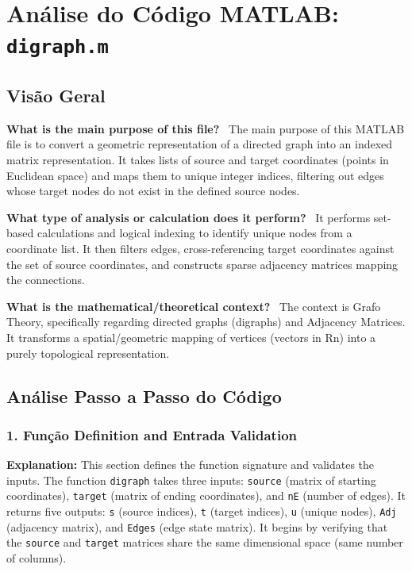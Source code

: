 
\chapter{Análise do Código MATLAB: \texttt{digraph.m}}
\author{Expert Software Engineer}
\section{Visão Geral}

\textbf{What is the main purpose of this file?} \
The main purpose of this MATLAB file is to convert a geometric representation of a directed graph into an indexed matrix representation. It takes lists of source and target coordinates (points in Euclidean space) and maps them to unique integer indices, filtering out edges whose target nodes do not exist in the defined source nodes.

\textbf{What type of analysis or calculation does it perform?} \
It performs set-based calculations and logical indexing to identify unique nodes from a coordinate list. It then filters edges, cross-referencing target coordinates against the set of source coordinates, and constructs sparse adjacency matrices mapping the connections.

\textbf{What is the mathematical/theoretical context?} \
The context is Grafo Theory, specifically regarding directed graphs (digraphs) and Adjacency Matrices. It transforms a spatial/geometric mapping of vertices (vectors in Rn) into a purely topological representation.

\section{Análise Passo a Passo do Código}

\subsection{1. Função Definition and Entrada Validation}
\textbf{Explanation:}
This section defines the function signature and validates the inputs. The function \texttt{digraph} takes three inputs: \texttt{source} (matrix of starting coordinates), \texttt{target} (matrix of ending coordinates), and \texttt{nE} (number of edges). It returns five outputs: \texttt{s} (source indices), \texttt{t} (target indices), \texttt{u} (unique nodes), \texttt{Adj} (adjacency matrix), and \texttt{Edges} (edge state matrix). It begins by verifying that the \texttt{source} and \texttt{target} matrices share the same dimensional space (same number of columns).

